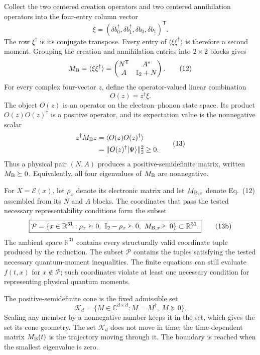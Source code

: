 \documentclass[10pt,letterpaper,twocolumn]{article}
\newcommand{\R}{\mathbb R}
\newcommand{\C}{\mathbb C}
\newcommand{\I}{\mathbb I}
\begin{document}
Collect the two centered creation operators and two centered annihilation
operators into the four-entry column vector
\[
\xi=(\delta b_0^\dagger,\delta b_1^\dagger,
      \delta b_0,\delta b_1)^{\mathsf T}.
\]
The row \(\xi^\dagger\) is its conjugate transpose.  Every entry of
\(\langle\xi\xi^\dagger\rangle\) is therefore a second moment.  Grouping the
creation and annihilation entries into \(2\times2\) blocks gives
\[
M_{\rm B}=\langle\xi\xi^\dagger\rangle
=\begin{pmatrix}N^{\mathsf T}&A^\ast\\A&\I_2+N\end{pmatrix}.
\tag{12}
\]
For every complex four-vector \(z\), define the operator-valued linear
combination
\[
O(z)=z^\dagger\xi.
\]
The object \(O(z)\) is an operator on the electron--phonon state space.  Its
product \(O(z)O(z)^\dagger\) is a positive operator, and its expectation value
is the nonnegative scalar
\[
\begin{aligned}
z^\dagger M_{\rm B}z
&=\langle O(z)O(z)^\dagger\rangle\\
&=\lVert O(z)^\dagger\lvert\Psi\rangle\rVert_2^2\geq0.
\end{aligned}
\tag{13}
\]
Thus a physical pair \((N,A)\) produces a positive-semidefinite matrix,
written \(M_{\rm B}\succeq0\).  Equivalently, all four eigenvalues of
\(M_{\rm B}\) are nonnegative.

For \(X=\mathcal E(x)\), let \(\rho_x\) denote its electronic matrix and let
\(M_{{\rm B},x}\) denote Eq.~(12) assembled from its \(N\) and \(A\) blocks.
The coordinates that pass the tested necessary representability conditions
form the subset
\[
\boxed{
\mathcal P=
\{x\in\R^{31}:
\rho_x\succeq0,\ \I_2-\rho_x\succeq0,\
M_{{\rm B},x}\succeq0\}
\subset\R^{31}.}
\tag{13b}
\]
The ambient space \(\R^{31}\) contains every structurally valid coordinate
tuple produced by the reduction.  The subset \(\mathcal P\) contains the
tuples satisfying the tested necessary quantum-moment inequalities.  The
finite equations can still evaluate \(f(t,x)\) for \(x\notin\mathcal P\);
such coordinates violate at least one necessary condition for representing
physical quantum moments.

The positive-semidefinite cone is the fixed admissible set
\[
\mathcal K_d
=\{M\in\C^{d\times d}:M=M^\dagger,\ M\succeq0\}.
\]
Scaling any member by a nonnegative number keeps it in the set, which gives
the set its cone geometry.  The set \(\mathcal K_d\) does not move in time;
the time-dependent matrix \(M_{\rm B}(t)\) is the trajectory moving through
it.  The boundary is reached when the smallest eigenvalue is zero.
\end{document}
